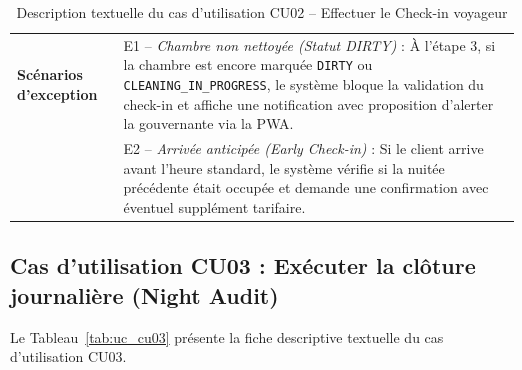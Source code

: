 \documentclass[12pt,a4paper,oneside]{report}
\begin{document}
\begin{table}[H]
\begin{tabularx}{\textwidth}{|p{3.5cm}|X|}
\hline
\textbf{Scénarios d'exception} & 
E1 -- \textit{Chambre non nettoyée (Statut DIRTY)} : À l'étape 3, si la chambre est encore marquée \texttt{DIRTY} ou \texttt{CLEANING\_IN\_PROGRESS}, le système bloque la validation du check-in et affiche une notification avec proposition d'alerter la gouvernante via la PWA.\\
& E2 -- \textit{Arrivée anticipée (Early Check-in)} : Si le client arrive avant l'heure standard, le système vérifie si la nuitée précédente était occupée et demande une confirmation avec éventuel supplément tarifaire.\\
\hline
\end{tabularx}
\caption{Description textuelle du cas d'utilisation CU02 -- Effectuer le Check-in voyageur}
\label{tab:uc_cu02}
\end{table}

\subsection{Cas d'utilisation CU03 : Exécuter la clôture journalière (Night Audit)}

Le Tableau~\ref{tab:uc_cu03} présente la fiche descriptive textuelle du cas d'utilisation CU03.
\end{document}
